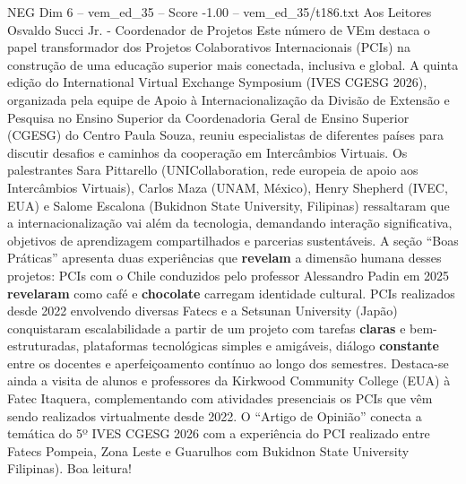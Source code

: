 \begin{textsample}{NEG Dim 6 – vem\_ed\_35 – Score -1.00 – vem\_ed\_35/t186.txt}  \label{ex:f6_neg_009}
Aos Leitores Osvaldo Succi Jr. - Coordenador de Projetos Este número de VEm destaca o papel transformador dos Projetos Colaborativos Internacionais (PCIs) na construção de uma educação superior mais conectada, inclusiva e global.
A quinta edição do International Virtual Exchange Symposium (IVES CGESG 2026), organizada pela equipe de Apoio à Internacionalização da Divisão de Extensão e Pesquisa no Ensino Superior da Coordenadoria Geral de Ensino Superior (CGESG) do Centro Paula Souza, reuniu especialistas de diferentes países para discutir desafios e caminhos da cooperação em Intercâmbios Virtuais.
Os palestrantes Sara Pittarello (UNICollaboration, rede europeia de apoio aos Intercâmbios Virtuais), Carlos Maza (UNAM, México), Henry Shepherd (IVEC, EUA) e Salome Escalona (Bukidnon State University, Filipinas) ressaltaram que a internacionalização vai além da tecnologia, demandando interação significativa, objetivos de aprendizagem compartilhados e parcerias sustentáveis.
A seção “Boas Práticas” apresenta duas experiências que \textbf{revelam} a dimensão humana desses projetos: PCIs com o Chile conduzidos pelo professor Alessandro Padin em 2025 \textbf{revelaram} como café e \textbf{chocolate} carregam identidade cultural.
PCIs realizados desde 2022 envolvendo diversas Fatecs e a Setsunan University (Japão) conquistaram escalabilidade a partir de um projeto com tarefas \textbf{claras} e bem-estruturadas, plataformas tecnológicas simples e amigáveis, diálogo \textbf{constante} entre os docentes e aperfeiçoamento contínuo ao longo dos semestres.
Destaca-se ainda a visita de alunos e professores da Kirkwood Community College (EUA) à Fatec Itaquera, complementando com atividades presenciais os PCIs que vêm sendo realizados virtualmente desde 2022.
O “Artigo de Opinião” conecta a temática do 5º IVES CGESG 2026 com a experiência do PCI realizado entre Fatecs Pompeia, Zona Leste e Guarulhos com Bukidnon State University Filipinas).
Boa leitura!

\end{textsample}
